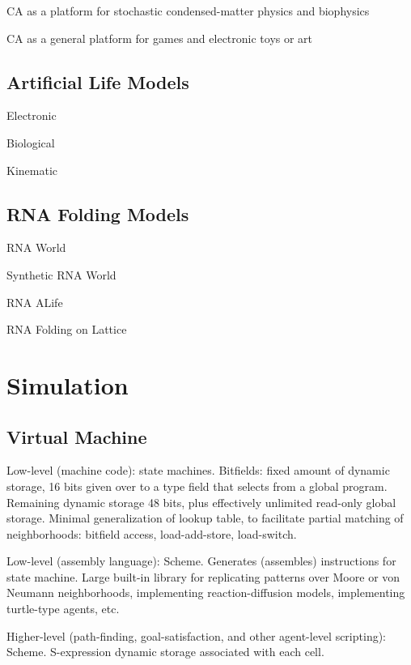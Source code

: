 \documentclass{acm_proc_article-sp}
\begin{document}
CA as a platform for stochastic condensed-matter physics and biophysics
\cite{Schiff2007}

CA as a general platform for games
\cite{SimCity,DwarfFortress,Minecraft}
and electronic toys or art \cite{RuckerCAPOW,PowderToy}

\subsection{Artificial Life Models}

Electronic
\cite{VonNeumannBook,Wireworld}

Biological
\cite{ConwaysLife,Langton1986}

Kinematic
\cite{Stevens2011}

\subsection{RNA Folding Models}

RNA World
\cite{Woese1967}

Synthetic RNA World
\cite{PaulJoyce2002}

RNA ALife
\cite{journals/alife/Schuster94}

RNA Folding on Lattice
\cite{LeoniVanderzande2003,JostEveraers2010,ZaraPretti2007,GillespieMayneJiang2009}

\section{Simulation}

\subsection{Virtual Machine}

Low-level (machine code):
state machines.
Bitfields: fixed amount of dynamic storage, 16 bits given over to a type field that selects from a global program.
Remaining dynamic storage 48 bits, plus effectively unlimited read-only global storage.
Minimal generalization of lookup table, to facilitate partial matching of neighborhoods:
bitfield access, load-add-store, load-switch.

Low-level (assembly language):
Scheme. Generates (assembles) instructions for state machine.
Large built-in library for replicating patterns over Moore or von Neumann neighborhoods,
implementing reaction-diffusion models, implementing turtle-type agents, etc.

Higher-level (path-finding, goal-satisfaction, and other agent-level scripting):
Scheme. S-expression dynamic storage associated with each cell.
\end{document}
